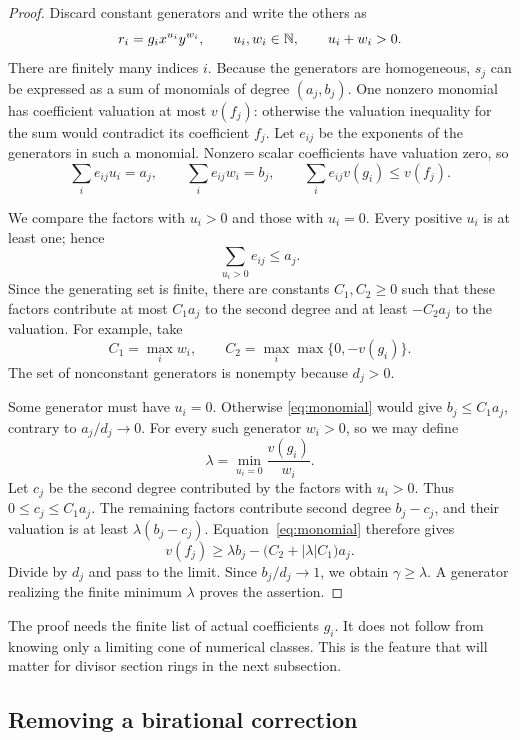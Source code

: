 \begin{proof}
Discard constant generators and write the others as
\[
r_i=g_ix^{u_i}y^{w_i},
\qquad u_i,w_i\in\mathbb N,\qquad u_i+w_i>0.
\]
There are finitely many indices \(i\). Because the generators are
homogeneous, \(s_j\) can be expressed as a sum of monomials of degree
\((a_j,b_j)\). One nonzero monomial has coefficient valuation at most
\(v(f_j)\): otherwise the valuation inequality for the sum would
contradict its coefficient \(f_j\). Let \(e_{ij}\) be the exponents
of the generators in such a monomial. Nonzero scalar coefficients
have valuation zero, so
\begin{equation}
\label{eq:monomial}
\sum_i e_{ij}u_i=a_j,\qquad
\sum_i e_{ij}w_i=b_j,\qquad
\sum_i e_{ij}v(g_i)\leq v(f_j).
\end{equation}

We compare the factors with \(u_i>0\) and those with \(u_i=0\).
Every positive \(u_i\) is at least one; hence
\[
\sum_{u_i>0}e_{ij}\leq a_j.
\]
Since the generating set is finite, there are constants \(C_1,C_2\geq0\)
such that these factors contribute at most \(C_1a_j\) to the second
degree and at least \(-C_2a_j\) to the valuation. For example, take
\[
C_1=\max_i w_i,\qquad
C_2=\max_i\max\{0,-v(g_i)\}.
\]
The set of nonconstant generators is nonempty because \(d_j>0\).

Some generator must have \(u_i=0\). Otherwise
\eqref{eq:monomial} would give \(b_j\leq C_1a_j\), contrary to
\(a_j/d_j\to0\). For every such generator \(w_i>0\), so we may define
\[
\lambda=\min_{u_i=0}\frac{v(g_i)}{w_i}.
\]
Let \(c_j\) be the second degree contributed by the factors with
\(u_i>0\). Thus \(0\leq c_j\leq C_1a_j\). The remaining factors
contribute second degree \(b_j-c_j\), and their valuation is at least
\(\lambda(b_j-c_j)\). Equation~\eqref{eq:monomial} therefore gives
\[
v(f_j)\geq
\lambda b_j-\bigl(C_2+|\lambda|C_1\bigr)a_j.
\]
Divide by \(d_j\) and pass to the limit. Since \(b_j/d_j\to1\), we
obtain \(\gamma\geq\lambda\). A generator realizing the finite minimum
\(\lambda\) proves the assertion.
\end{proof}

The proof needs the finite list of actual coefficients \(g_i\).
It does not follow from knowing only a limiting cone of numerical
classes. This is the feature that will matter for divisor section
rings in the next subsection.

\subsection{Removing a birational correction}
\label{sec:geometric}


